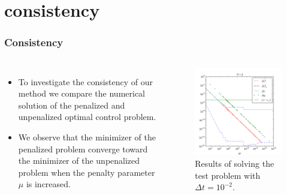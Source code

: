\documentclass[9pt]{beamer}
\begin{document}
\section{consistency}
\begin{frame}
\frametitle{Consistency}
\begin{columns}
\begin{itemize}
\item{To investigate the consistency of our method we compare the numerical solution of the penalized and unpenalized optimal control problem.}
\item{We observe that the minimizer of the penalized problem converge toward the minimizer of the unpenalized problem when the penalty parameter $\mu$ is increased.}
\end{itemize}
\begin{figure}[!h]
\centering
\includegraphics[scale=0.35]{con2.png}
\caption{Results of solving the test problem with $\Delta t=10^{-2}$. }
\end{figure}
\end{columns}
\end{frame}
\end{document}
